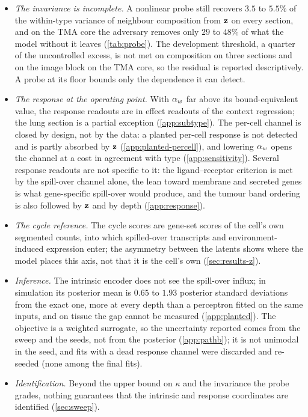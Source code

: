 \begin{itemize}[leftmargin=*,itemsep=2pt]
\item \emph{The invariance is incomplete.} A nonlinear probe still recovers $3.5$ to $5.5\%$ of the within-type variance of neighbour composition from $\mathbf{z}$ on every section, and on the TMA core the adversary removes only $29$ to $48\%$ of what the model without it leaves (\cref{tab:probe}). The development threshold, a quarter of the uncontrolled excess, is not met on composition on three sections and on the image block on the TMA core, so the residual is reported descriptively. A probe at its floor bounds only the dependence it can detect.
\item \emph{The response at the operating point.} With $\alpha_w$ far above its bound-equivalent value, the response readouts are in effect readouts of the context regression; the lung section is a partial exception (\cref{app:subtype}). The per-cell channel is closed by design, not by the data: a planted per-cell response is not detected and is partly absorbed by $\mathbf{z}$ (\cref{app:planted-percell}), and lowering $\alpha_w$ opens the channel at a cost in agreement with type (\cref{app:sensitivity}). Several response readouts are not specific to it: the ligand--receptor criterion is met by the spill-over channel alone, the lean toward membrane and secreted genes is what gene-specific spill-over would produce, and the tumour band ordering is also followed by $\mathbf{z}$ and by depth (\cref{app:response}).
\item \emph{The cycle reference.} The cycle scores are gene-set scores of the cell's own segmented counts, into which spilled-over transcripts and environment-induced expression enter; the asymmetry between the latents shows where the model places this axis, not that it is the cell's own (\cref{sec:results-z}).
\item \emph{Inference.} The intrinsic encoder does not see the spill-over influx; in simulation its posterior mean is $0.65$ to $1.93$ posterior standard deviations from the exact one, more at every depth than a perceptron fitted on the same inputs, and on tissue the gap cannot be measured (\cref{app:planted}). The objective is a weighted surrogate, so the uncertainty reported comes from the sweep and the seeds, not from the posterior (\cref{app:pathb}); it is not unimodal in the seed, and fits with a dead response channel were discarded and re-seeded (none among the final fits).
\item \emph{Identification.} Beyond the upper bound on $\kappa$ and the invariance the probe grades, nothing guarantees that the intrinsic and response coordinates are identified (\cref{sec:sweep}).

\end{itemize}
